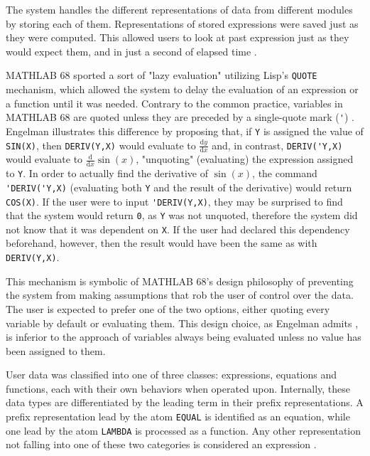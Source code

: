 The system handles the different representations of data from different modules by storing each of them. Representations of stored expressions were saved just as they were computed. This allowed users to look at past expression just as they would expect them, and in just a second of elapsed time \parencite{engelman1971legacy}.

MATHLAB 68 sported a sort of "lazy evaluation" utilizing Lisp's \verb|QUOTE| mechanism, which allowed the system to delay the evaluation of an expression or a function until it was needed. Contrary to the common practice, variables in MATHLAB 68 are quoted unless they are preceded by a single-quote mark (\verb|'|) \parencite{engelman1971legacy}. Engelman illustrates this difference by proposing that, if \verb|Y| is assigned the value of \verb|SIN(X)|, then \verb|DERIV(Y,X)| would evaluate to $\frac{\mathrm{d}y}{\mathrm{d}x}$ and, in contrast, \verb|DERIV('Y,X)| would evaluate to $\frac{\mathrm{d}}{\mathrm{d}x} \sin(x)$, "unquoting" (evaluating) the expression assigned to \verb|Y|. In order to actually find the derivative of $\sin(x)$, the command \verb|'DERIV('Y,X)| (evaluating both \verb|Y| and the result of the derivative) would return \verb|COS(X)|. If the user were to input \verb|'DERIV(Y,X)|, they may be surprised to find that the system would return \verb|0|, as \verb|Y| was not unquoted, therefore the system did not know that it was dependent on \verb|X|. If the user had declared this dependency beforehand, however, then the result would have been the same as with \verb|DERIV(Y,X)|.

This mechanism is symbolic of MATHLAB 68's design philosophy of preventing the system from making assumptions that rob the user of control over the data. The user is expected to prefer one of the two options, either quoting every variable by default or evaluating them. This design choice, as Engelman admits \parencite{engelman1971legacy}, is inferior to the approach of variables always being evaluated unless no value has been assigned to them.

User data was classified into one of three classes: expressions, equations and functions, each with their own behaviors when operated upon. Internally, these data types are differentiated by the leading term in their prefix representations. A prefix representation lead by the atom \verb|EQUAL| is identified as an equation, while one lead by the atom \verb|LAMBDA| is processed as a function. Any other representation not falling into one of these two categories is considered an expression \parencite{engelman1971legacy}.

